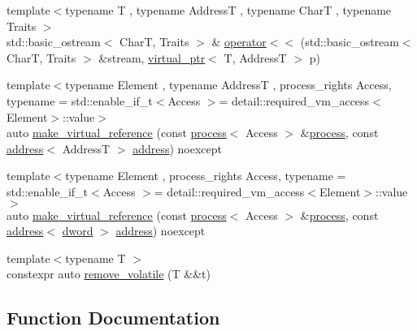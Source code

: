 \begin{DoxyCompactItemize}
\item 
{\footnotesize template$<$typename T , typename AddressT , typename CharT , typename Traits $>$ }\\std\+::basic\+\_\+ostream$<$ CharT, Traits $>$ \& \mbox{\hyperlink{namespacedistant_1_1memory_a9fa01f25df79ff7c22a84d717fdb4539}{operator$<$$<$}} (std\+::basic\+\_\+ostream$<$ CharT, Traits $>$ \&stream, \mbox{\hyperlink{classdistant_1_1memory_1_1virtual__ptr}{virtual\+\_\+ptr}}$<$ T, AddressT $>$ p)
\item 
{\footnotesize template$<$typename Element , typename AddressT , process\+\_\+rights Access, typename  = std\+::enable\+\_\+if\+\_\+t$<$\+Access $>$= detail\+::required\+\_\+vm\+\_\+access$<$\+Element$>$\+::value$>$ }\\auto \mbox{\hyperlink{namespacedistant_1_1memory_abd3c8f39450cad344c08cd8036efc2d7}{make\+\_\+virtual\+\_\+reference}} (const \mbox{\hyperlink{classdistant_1_1kernel__objects_1_1process}{process}}$<$ Access $>$ \&\mbox{\hyperlink{classdistant_1_1kernel__objects_1_1process}{process}}, const \mbox{\hyperlink{classdistant_1_1memory_1_1address}{address}}$<$ AddressT $>$ \mbox{\hyperlink{classdistant_1_1memory_1_1address}{address}}) noexcept
\item 
{\footnotesize template$<$typename Element , process\+\_\+rights Access, typename  = std\+::enable\+\_\+if\+\_\+t$<$\+Access $>$= detail\+::required\+\_\+vm\+\_\+access$<$\+Element$>$\+::value$>$ }\\auto \mbox{\hyperlink{namespacedistant_1_1memory_af20ac6e74d8e00e996bfa16048ae36e2}{make\+\_\+virtual\+\_\+reference}} (const \mbox{\hyperlink{classdistant_1_1kernel__objects_1_1process}{process}}$<$ Access $>$ \&\mbox{\hyperlink{classdistant_1_1kernel__objects_1_1process}{process}}, const \mbox{\hyperlink{classdistant_1_1memory_1_1address}{address}}$<$ \mbox{\hyperlink{namespacedistant_a9fa41a5a1a17dcbd24da1c1855c92489}{dword}} $>$ \mbox{\hyperlink{classdistant_1_1memory_1_1address}{address}}) noexcept
\item 
{\footnotesize template$<$typename T $>$ }\\constexpr auto \mbox{\hyperlink{namespacedistant_1_1memory_a796f3ecce5e93dc03cd01f2894fa4aba}{remove\+\_\+volatile}} (T \&\&t)
\end{DoxyCompactItemize}


\subsection{Function Documentation}
\mbox{\label{namespacedistant_1_1memory_a3497f1e6d6d81c0d01cdf57136980099}} 
